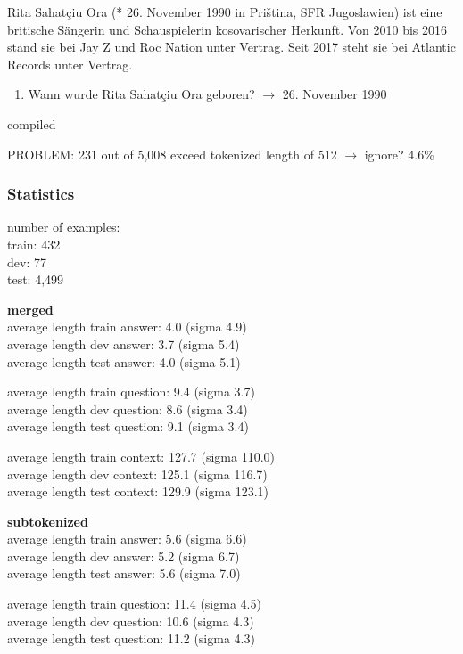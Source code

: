\begin{examples}
	\label{ex:mlqa}
	\item Rita Sahatçiu Ora (* 26. November 1990 in Priština, SFR Jugoslawien) ist eine britische Sängerin und Schauspielerin kosovarischer Herkunft. Von 2010 bis 2016 stand sie bei Jay Z und Roc Nation unter Vertrag. Seit 2017 steht sie bei Atlantic Records unter Vertrag.
\end{examples}

\begin{enumerate}
	\item Wann wurde Rita Sahatçiu Ora geboren? $\rightarrow$ 26. November 1990
\end{enumerate}

\cite{lewis2019mlqa} compiled

PROBLEM: 231 out of 5,008 exceed tokenized length of 512 $\rightarrow$ ignore? 4.6\%

\subsubsection{Statistics}

number of examples: \\
train: 432 \\
dev: 77 \\
test: 4,499

\textbf{merged} \\
average length train answer: 4.0 (sigma 4.9) \\
average length dev answer: 3.7 (sigma 5.4) \\
average length test answer: 4.0 (sigma 5.1)

average length train question: 9.4 (sigma 3.7) \\
average length dev question: 8.6 (sigma 3.4) \\
average length test question: 9.1 (sigma 3.4)

average length train context: 127.7 (sigma 110.0) \\
average length dev context: 125.1 (sigma 116.7) \\
average length test context: 129.9 (sigma 123.1)

\textbf{subtokenized} \\
average length train answer: 5.6 (sigma 6.6) \\
average length dev answer: 5.2 (sigma 6.7) \\
average length test answer: 5.6 (sigma 7.0)

average length train question: 11.4 (sigma 4.5) \\
average length dev question: 10.6 (sigma 4.3) \\
average length test question: 11.2 (sigma 4.3)

